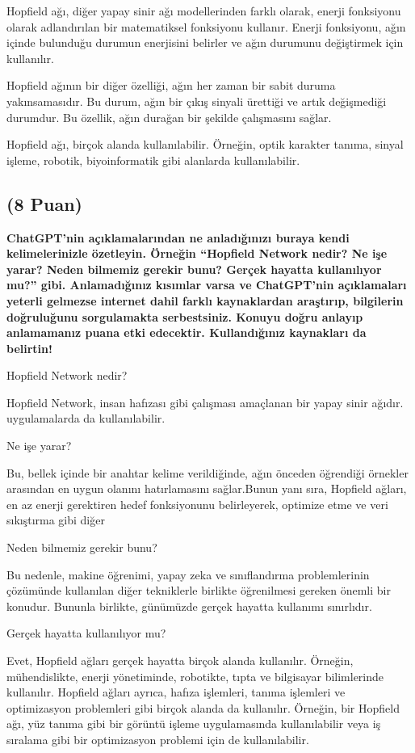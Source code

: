 \documentclass[11pt]{article}
\begin{document}
Hopfield ağı, diğer yapay sinir ağı modellerinden farklı olarak, enerji fonksiyonu olarak adlandırılan bir matematiksel fonksiyonu kullanır. Enerji fonksiyonu, ağın içinde bulunduğu durumun enerjisini belirler ve ağın durumunu değiştirmek için kullanılır.

Hopfield ağının bir diğer özelliği, ağın her zaman bir sabit duruma yakınsamasıdır. Bu durum, ağın bir çıkış sinyali ürettiği ve artık değişmediği durumdur. Bu özellik, ağın durağan bir şekilde çalışmasını sağlar.

Hopfield ağı, birçok alanda kullanılabilir. Örneğin, optik karakter tanıma, sinyal işleme, robotik, biyoinformatik gibi alanlarda kullanılabilir.


\subsection{(8 Puan)} \textbf{ChatGPT’nin açıklamalarından ne anladığınızı buraya kendi kelimelerinizle özetleyin. Örneğin ``Hopfield Network nedir? Ne işe yarar? Neden bilmemiz gerekir bunu? Gerçek hayatta kullanılıyor mu?'' gibi. Anlamadığınız kısımlar varsa ve ChatGPT’nin açıklamaları yeterli gelmezse internet dahil farklı kaynaklardan araştırıp, bilgilerin doğruluğunu sorgulamakta serbestsiniz. Konuyu doğru anlayıp anlamamanız puana etki edecektir. Kullandığınız kaynakları da belirtin!}

Hopfield Network nedir?

Hopfield Network, insan hafızası gibi çalışması amaçlanan bir yapay sinir ağıdır. uygulamalarda da kullanılabilir.

Ne işe yarar?

Bu, bellek içinde bir anahtar kelime verildiğinde, ağın önceden öğrendiği örnekler arasından en uygun olanını hatırlamasını sağlar.Bunun yanı sıra, Hopfield ağları, en az enerji gerektiren hedef fonksiyonunu belirleyerek, optimize etme ve veri sıkıştırma gibi diğer 

Neden bilmemiz gerekir bunu?

Bu nedenle, makine öğrenimi, yapay zeka ve sınıflandırma problemlerinin çözümünde kullanılan diğer tekniklerle birlikte öğrenilmesi gereken önemli bir konudur. Bununla birlikte, günümüzde gerçek hayatta kullanımı sınırlıdır.

Gerçek hayatta kullanılıyor mu?

Evet, Hopfield ağları gerçek hayatta birçok alanda kullanılır. Örneğin, mühendislikte, enerji yönetiminde, robotikte, tıpta ve bilgisayar bilimlerinde kullanılır. Hopfield ağları ayrıca, hafıza işlemleri, tanıma işlemleri ve optimizasyon problemleri gibi birçok alanda da kullanılır. Örneğin, bir Hopfield ağı, yüz tanıma gibi bir görüntü işleme uygulamasında kullanılabilir veya iş sıralama gibi bir optimizasyon problemi için de kullanılabilir.
\end{document}
